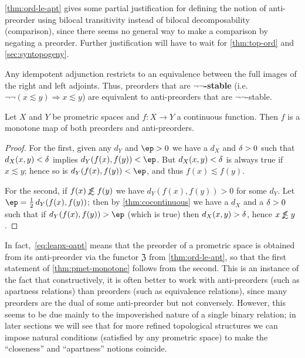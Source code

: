 \documentclass{article}
\def\oapt{\mathrel{\!\not\,\not\lesssim}}
\def\leapx{\lesssim}
\let\implies\Rightarrow
\def\neigh{\mathfrak{Z}}
\def\nn{\ensuremath{\neg\neg}}
\def\Set{\mathbf{Set}}
\begin{document}
\cref{thm:ord-le-apt} gives some partial justification for defining the notion of anti-preorder using bilocal transitivity instead of bilocal decomposability (comparison), since there seems no general way to make a comparison by negating a preorder.
Further justification will have to wait for \cref{thm:top-ord} and \cref{sec:syntopogeny}.

Any idempotent adjunction restricts to an equivalence between the full images of the right and left adjoints.
Thus, preorders that are \textbf{\nn-stable} (i.e.\ $\neg\neg(x\leapx y) \implies x\leapx y$) are equivalent to anti-preorders that are \nn-stable.

\begin{thm}\label{thm:pmet-monotone}
  Let $X$ and $Y$ be prometric spaces and $f:X\to Y$ a continuous function.
  Then $f$ is a monotone map of both preorders and anti-preorders.
\end{thm}
\begin{proof}
  For the first, given any $d_Y$ and $\ep>0$ we have a $d_X$ and $\delta>0$ such that $d_X(x,y)<\delta$ implies $d_Y(f(x),f(y))<\ep$.
  But $d_X(x,y)<\delta$ is always true if $x\leapx y$; hence so is $d_Y(f(x),f(y))<\ep$, and thus $f(x)\leapx f(y)$.

  For the second, if $f(x)\oapt f(y)$ we have $d_Y(f(x),f(y))>0$ for some $d_Y$.
  Let $\ep = \frac12 \,d_Y(f(x),f(y))$; then by \cref{thm:cocontinuous} we have a $d_X$ and a $\delta>0$ such that if $d_Y(f(x),f(y))>\ep$ (which is true) then $d_X(x,y)>\delta$, hence $x\oapt y$.
\end{proof}

In fact,~\eqref{eq:leapx-oapt} means that the preorder of a prometric space is obtained from its anti-preorder via the functor $\neigh$ from \cref{thm:ord-le-apt}, so that the first statement of \cref{thm:pmet-monotone} follows from the second.
This is an instance of the fact that constructively, it is often better to work with anti-preorders (such as apartness relations) than preorders (such as equivalence relations), since many preorders are the dual of some anti-preorder but not conversely.
However, this seems to be due mainly to the impoverished nature of a single binary relation; in later sections we will see that for more refined topological structures we can impose natural conditions (satisfied by any prometric space) to make the ``closeness'' and ``apartness'' notions coincide.

\end{document}
